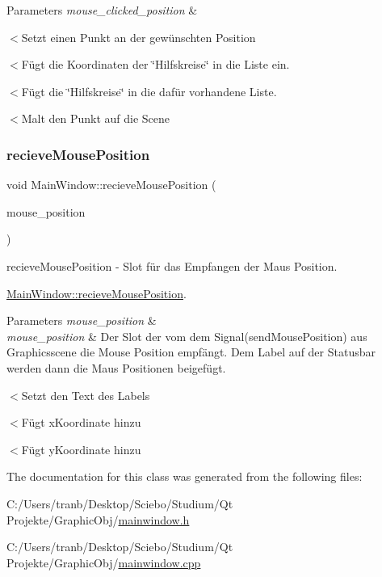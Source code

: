 \begin{DoxyParams}{Parameters}
{\em mouse\+\_\+clicked\+\_\+position} & \\
\hline
\end{DoxyParams}
$<$Setzt einen Punkt an der gewünschten Position

$<$Fügt die Koordinaten der \char`\"{}\+Hilfskreise\char`\"{} in die Liste ein.

$<$Fügt die \char`\"{}\+Hilfskreise\char`\"{} in die dafür vorhandene Liste.

$<$Malt den Punkt auf die Scene \mbox{\label{class_main_window_a965877b0ba4c3f18035232a9eb7b98e0}} 
\subsubsection{\texorpdfstring{recieve\+Mouse\+Position}{recieveMousePosition}}
{\footnotesize\ttfamily void Main\+Window\+::recieve\+Mouse\+Position (\begin{DoxyParamCaption}\item[{Q\+PointF}]{mouse\+\_\+position }\end{DoxyParamCaption})\hspace{0.3cm}{\ttfamily [slot]}}



recieve\+Mouse\+Position -\/ Slot für das Empfangen der Maus Position. 

\hyperlink{class_main_window_a965877b0ba4c3f18035232a9eb7b98e0}{Main\+Window\+::recieve\+Mouse\+Position}.


\begin{DoxyParams}{Parameters}
{\em mouse\+\_\+position} & \\
\hline
{\em mouse\+\_\+position} & Der Slot der vom dem Signal(send\+Mouse\+Position) aus Graphicsscene die Mouse Position empfängt. Dem Label auf der Statusbar werden dann die Maus Positionen beigefügt. \\
\hline
\end{DoxyParams}
$<$Setzt den Text des Labels

$<$Fügt x\+Koordinate hinzu

$<$Fügt y\+Koordinate hinzu 

The documentation for this class was generated from the following files\+:\begin{DoxyCompactItemize}
\item 
C\+:/\+Users/tranb/\+Desktop/\+Sciebo/\+Studium/\+Qt Projekte/\+Graphic\+Obj/\hyperlink{mainwindow_8h}{mainwindow.\+h}\item 
C\+:/\+Users/tranb/\+Desktop/\+Sciebo/\+Studium/\+Qt Projekte/\+Graphic\+Obj/\hyperlink{mainwindow_8cpp}{mainwindow.\+cpp}\end{DoxyCompactItemize}
